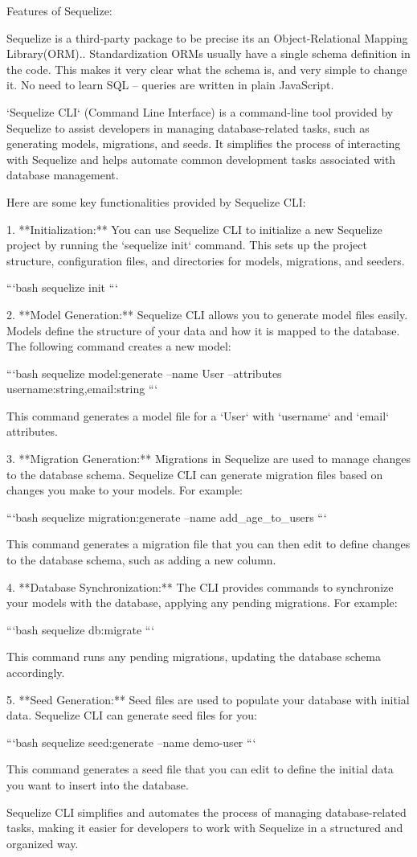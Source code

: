 Features of Sequelize:

Sequelize is a third-party package to be precise its an Object-Relational Mapping Library(ORM)..
Standardization ORMs usually have a single schema definition in the code. This makes it very clear what the schema is, and very simple to change it.
No need to learn SQL – queries are written in plain JavaScript.



`Sequelize CLI` (Command Line Interface) is a command-line tool provided by Sequelize to assist developers in managing database-related tasks, such as generating models, migrations, and seeds. It simplifies the process of interacting with Sequelize and helps automate common development tasks associated with database management.

Here are some key functionalities provided by Sequelize CLI:

1. **Initialization:** You can use Sequelize CLI to initialize a new Sequelize project by running the `sequelize init` command. This sets up the project structure, configuration files, and directories for models, migrations, and seeders.

   ```bash
   sequelize init
   ```

2. **Model Generation:** Sequelize CLI allows you to generate model files easily. Models define the structure of your data and how it is mapped to the database. The following command creates a new model:

   ```bash
   sequelize model:generate --name User --attributes username:string,email:string
   ```

   This command generates a model file for a `User` with `username` and `email` attributes.

3. **Migration Generation:** Migrations in Sequelize are used to manage changes to the database schema. Sequelize CLI can generate migration files based on changes you make to your models. For example:

   ```bash
   sequelize migration:generate --name add_age_to_users
   ```

   This command generates a migration file that you can then edit to define changes to the database schema, such as adding a new column.

4. **Database Synchronization:** The CLI provides commands to synchronize your models with the database, applying any pending migrations. For example:

   ```bash
   sequelize db:migrate
   ```

   This command runs any pending migrations, updating the database schema accordingly.

5. **Seed Generation:** Seed files are used to populate your database with initial data. Sequelize CLI can generate seed files for you:

   ```bash
   sequelize seed:generate --name demo-user
   ```

   This command generates a seed file that you can edit to define the initial data you want to insert into the database.

Sequelize CLI simplifies and automates the process of managing database-related tasks, making it easier for developers to work with Sequelize in a structured and organized way.